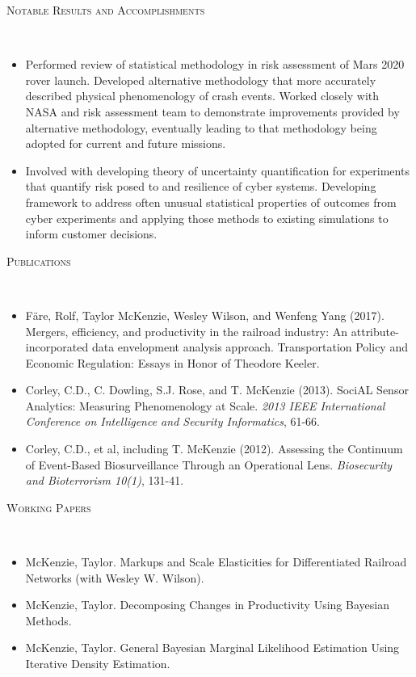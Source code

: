 \documentclass[11pt]{article}
\newenvironment{changemargin}[2]{%
  \begin{list}{}{%
    \setlength{\topsep}{0pt}%
    \setlength{\leftmargin}{#1}%
    \setlength{\rightmargin}{#2}%
    \setlength{\listparindent}{\parindent}%
    \setlength{\itemindent}{\parindent}%
    \setlength{\parsep}{\parskip}%
  }%
  \item[]}{\end{list}
}
\newcommand{\lineover}{
	\begin{changemargin}{-0.05in}{-0.05in}
		\vspace*{-8pt}
		\hrulefill \\
		\vspace*{-2pt}
	\end{changemargin}
}
\newcommand{\header}[1]{
	\begin{changemargin}{-0.5in}{-0.5in}
		\scshape{#1}\\
  	\lineover
	\end{changemargin}
}
\newenvironment{body} {
	\vspace*{-16pt}
	\begin{changemargin}{-0.25in}{-0.5in}
  }	
	{\end{changemargin}
}
\begin{document}
\smallskip
\header{Notable Results and Accomplishments}
\begin{body}
	\vspace{14pt}
	\begin{itemize}
		\item Performed review of statistical methodology in risk assessment of Mars 2020 rover launch. Developed alternative methodology that more accurately described physical phenomenology of crash events. Worked closely with NASA and risk assessment team to demonstrate improvements provided by alternative methodology, eventually leading to that methodology being adopted for current and future missions.
		\item Involved with developing theory of uncertainty quantification for experiments that quantify risk posed to and resilience of cyber systems. Developing framework to address often unusual statistical properties of outcomes from cyber experiments and applying those methods to existing simulations to inform customer decisions.
	\end{itemize}
\end{body}

\smallskip
\header{Publications}

\begin{body}
\vspace{14pt}
\begin{itemize}
	\item F\"{a}re, Rolf, Taylor McKenzie, Wesley Wilson, and Wenfeng Yang (2017). Mergers, efficiency, and productivity in the railroad industry: An attribute-incorporated data envelopment analysis approach. Transportation Policy and Economic Regulation: Essays in Honor of Theodore Keeler.
	\item Corley, C.D., C. Dowling, S.J. Rose, and T. McKenzie (2013). SociAL Sensor Analytics: Measuring Phenomenology at Scale. \textit{2013 IEEE International Conference on Intelligence and Security Informatics}, 61-66.
	\item Corley, C.D., et al, including T. McKenzie (2012). Assessing the Continuum of Event-Based Biosurveillance Through an Operational Lens. \textit{Biosecurity and Bioterrorism 10(1)}, 131-41.
\end{itemize}
\end{body}

\smallskip
\header{Working Papers}

\begin{body}
\vspace{14pt}
\begin{itemize}
	\item McKenzie, Taylor. Markups and Scale Elasticities for Differentiated Railroad Networks (with Wesley W. Wilson).
	\item McKenzie, Taylor. Decomposing Changes in Productivity Using Bayesian Methods.
	\item McKenzie, Taylor. General Bayesian Marginal Likelihood Estimation Using Iterative Density Estimation.
\end{itemize}
\end{body}
\end{document}

